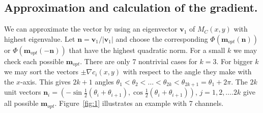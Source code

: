 \documentclass[conference]{IEEEtran}
\begin{document}
\subsection{Approximation and calculation of the gradient.}
We can approximate the vector by using an eigenvector $\mathbf{v}_1$ of $M_C(x,y)$ with highest eigenvalue. Let $\mathbf{n}=\mathbf{v}_1/|\mathbf{v}_1|$ and choose the corresponding $\Phi(\mathbf{m}_{opt}(\mathbf{n}))$ or $\Phi(\mathbf{m}_{opt}(-\mathbf{n}))$ that have the highest quadratic norm.
%
For a small $k$ we may check each possible $\mathbf{m}_{opt}$. There are only 7 nontrivial cases for $k=3$.
%
For bigger $k$ we may sort the vectors $\pm\nabla c_i(x,y)$ with respect to the angle they make with the $x$-axis. This gives $2k+1$ angles $\theta_1<\theta_2<\ldots<\theta_{2k}<\theta_{2k+1}=\theta_1+2\pi$.
The $2k$ unit vectors $\mathbf{n}_i=\left(
-\sin\frac12(\theta_{i}+\theta_{i+1}),
\cos\frac12(\theta_{i}+\theta_{i+1})
\right)
$, $j=1,2,\ldots.2k$ give all possible $\mathbf{m}_{opt}$. Figure~\ref{fig:1} illustrates an example with 7 channels.
%
\end{document}
